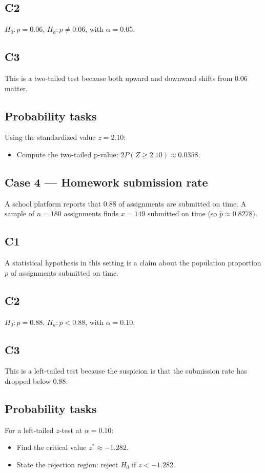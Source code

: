\begin{ExamProblems}
		\subsection*{C2}
		\(H_0\colon p=0.06\), \(H_a\colon p\neq 0.06\), with \(\alpha=0.05\).

		\subsection*{C3}
		This is a two-tailed test because both upward and downward shifts from 0.06 matter.

		\subsection*{Probability tasks}
		Using the standardized value \(z=2.10\):
		\begin{itemize}
			\item Compute the two-tailed p-value: \(2P(Z\ge 2.10)\approx 0.0358\).
		\end{itemize}

		\item
		\subsection*{Case 4 — Homework submission rate}
		A school platform reports that 0.88 of assignments are submitted on time. A sample of \(n=180\) assignments finds \(x=149\) submitted on time (so \(\hat p\approx 0.8278\)).

		\subsection*{C1}
		A statistical hypothesis in this setting is a claim about the population proportion \(p\) of assignments submitted on time.

		\subsection*{C2}
		\(H_0\colon p=0.88\), \(H_a\colon p<0.88\), with \(\alpha=0.10\).

		\subsection*{C3}
		This is a left-tailed test because the suspicion is that the submission rate has dropped below 0.88.

		\subsection*{Probability tasks}
		For a left-tailed \(z\)-test at \(\alpha=0.10\):
		\begin{itemize}
			\item Find the critical value \(z^*\approx -1.282\).
			\item State the rejection region: reject \(H_0\) if \(z<-1.282\).
		\end{itemize}


\end{ExamProblems}
